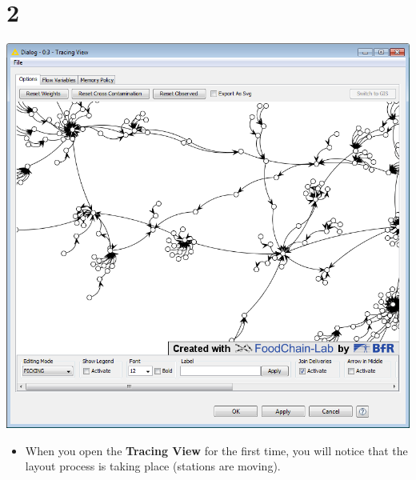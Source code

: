 \documentclass{beamer}
\begin{document}
\section{2}
\begin{frame}
	\begin{center}
  		\includegraphics[height=0.6\textheight]{2.png}
	\end{center}
	\begin{itemize}
		\item When you open the \textbf{Tracing View} for the first time, you will notice that the layout process is taking place (stations are moving).
	\end{itemize}
\end{frame}
\end{document}
